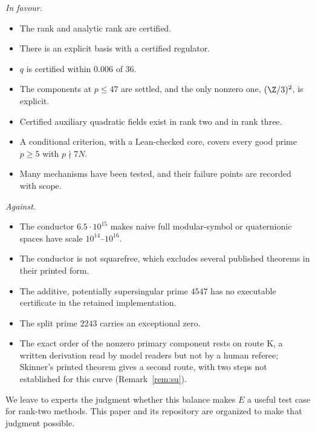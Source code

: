 \emph{In favour.}
\begin{itemize}[leftmargin=*]
\item The rank and analytic rank are certified.
\item There is an explicit basis with a certified regulator.
\item $q$ is certified within $0.006$ of $36$.
\item The components at $p\le47$ are settled, and the only nonzero one, $(\Z/3)^2$, is explicit.
\item Certified auxiliary quadratic fields exist in rank two and in rank three.
\item A conditional criterion, with a Lean-checked core, covers every good prime $p\ge5$ with $p\nmid7N$.
\item Many mechanisms have been tested, and their failure points are recorded with scope.
\end{itemize}

\emph{Against.}
\begin{itemize}[leftmargin=*]
\item The conductor $6.5\cdot10^{15}$ makes naive full modular-symbol or quaternionic spaces have scale $10^{14}$--$10^{16}$.
\item The conductor is not squarefree, which excludes several published theorems in their printed form.
\item The additive, potentially supersingular prime $4547$ has no executable certificate in the retained implementation.
\item The split prime $2243$ carries an exceptional zero.
\item The exact order of the nonzero primary component rests on route K, a written derivation read by model readers but not by a human referee; Skinner's printed theorem gives a second route, with two steps not established for this curve (Remark~\ref{rem:su}).
\end{itemize}

We leave to experts the judgment whether this balance makes $E$ a useful test case for rank-two methods. This paper and its repository are organized to make that judgment possible.
